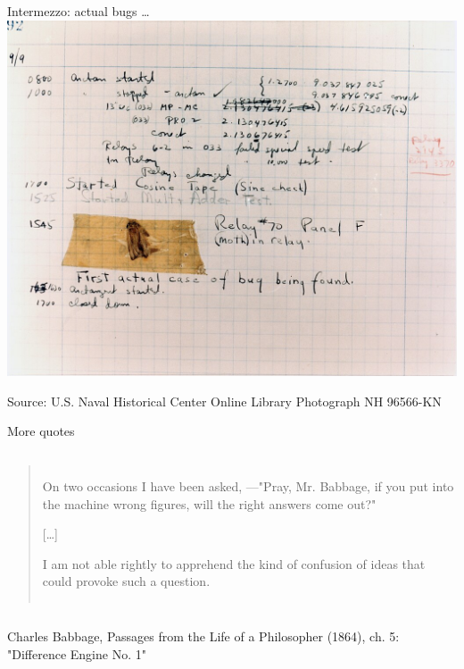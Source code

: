 \documentclass[aspectratio=169,usenames,dvipsnames]{beamer}
\begin{document}
\begin{frame}{Intermezzo: actual bugs \dots}
    \includegraphics[height=0.8\textheight]{fig/bug}

    Source: U.S. Naval Historical Center Online Library Photograph NH 96566-KN
\end{frame}



\begin{frame}{More quotes}
    \begin{columns}
    \begin{quote}\normalfont
    On two occasions I have been asked, ---"Pray, Mr. Babbage, if you put
    into the machine wrong figures, will the right answers come out?"

    [\dots]

    I am not able rightly to apprehend the kind of
	confusion of ideas that could provoke such a question.
	
    \end{quote}
    \end{columns}
	\vspace{1em}
    Charles Babbage, Passages from the Life of a Philosopher (1864), ch. 5:
    "Difference Engine No. 1"
\end{frame}

%
%
%
\end{document}
